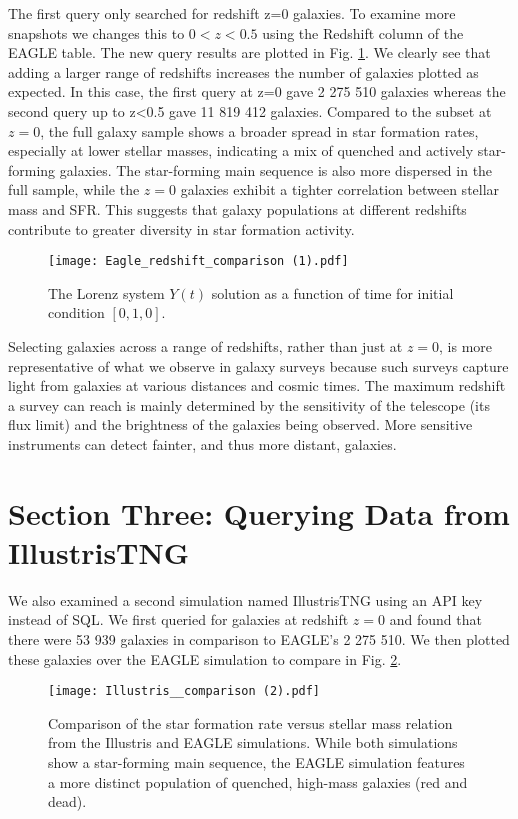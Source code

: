 \documentclass[10pt]{article}
\begin{document}
The first query only searched for redshift z=0 galaxies. To examine more snapshots we changes this to $0<z<0.5$ using the Redshift column of the EAGLE table. The new query results are plotted in Fig. \ref{fig:eagle_both_redshifts}. We clearly see that adding a larger range of redshifts increases the number of galaxies plotted as expected. In this case, the first query at z=0 gave 2 275 510 galaxies whereas the second query up to z<0.5 gave 11 819 412 galaxies. Compared to the subset at \( z = 0 \), the full galaxy sample shows a broader spread in star formation rates, especially at lower stellar masses, indicating a mix of quenched and actively star-forming galaxies. The star-forming main sequence is also more dispersed in the full sample, while the \( z = 0 \) galaxies exhibit a tighter correlation between stellar mass and SFR. This suggests that galaxy populations at different redshifts contribute to greater diversity in star formation activity.


\begin{figure}[H]
    \centering
    \texttt{[image: Eagle\_redshift\_comparison (1).pdf]}
    \caption{The Lorenz system  \( Y(t) \) solution as a function of time for initial condition \( [0, 1, 0] \). }
    \label{fig:eagle_both_redshifts}
\end{figure}


Selecting galaxies across a range of redshifts, rather than just at \( z = 0 \), is more representative of what we observe in galaxy surveys because such surveys capture light from galaxies at various distances and cosmic times. The maximum redshift a survey can reach is mainly determined by the sensitivity of the telescope (its flux limit) and the brightness of the galaxies being observed. More sensitive instruments can detect fainter, and thus more distant, galaxies.

\section*{Section Three: Querying Data from IllustrisTNG}
We also examined a second simulation named IllustrisTNG using an API key instead of SQL. We first queried for galaxies at redshift $z=0$ and found that there were 53 939 galaxies in comparison to EAGLE's 2 275 510. We then plotted these galaxies over the EAGLE simulation to compare in Fig. \ref{fig:illustris_comparison}.

\begin{figure}[H]
    \centering
    \texttt{[image: Illustris\_\_comparison (2).pdf]}
    \caption{Comparison of the star formation rate versus stellar mass relation from the Illustris and EAGLE simulations. While both simulations show a star-forming main sequence, the EAGLE simulation features a more distinct population of quenched, high-mass galaxies (red and dead).}

    \label{fig:illustris_comparison}
\end{figure}
\end{document}
